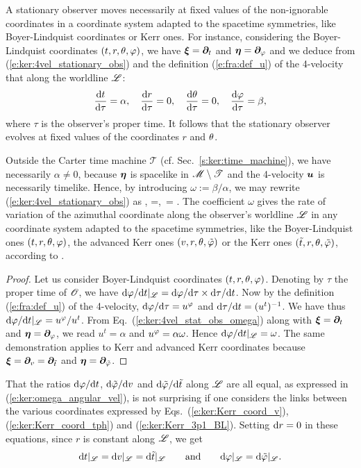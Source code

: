A stationary observer moves necessarily at fixed values of the non-ignorable coordinates
in a coordinate system adapted to the spacetime symmetries, like Boyer-Lindquist coordinates or Kerr
ones. For instance, considering the Boyer-Lindquist coordinates $(t, r, \theta, \varphi)$,
we have $\bm{\xi} = \bm{\partial}_t$ and $\bm{\eta} = \bm{\partial}_\varphi$ and
we deduce from (\ref{e:ker:4vel_stationary_obs}) and the definition (\ref{e:fra:def_u}) of the
4-velocity that along the worldline $\mathscr{L}$:
\[
    \frac{\mathrm{d} t}{\mathrm{d}\tau} = \alpha,\quad
    \frac{\mathrm{d} r}{\mathrm{d}\tau} = 0,\quad
    \frac{\mathrm{d} \theta}{\mathrm{d}\tau} = 0,\quad
    \frac{\mathrm{d} \varphi}{\mathrm{d}\tau} = \beta,
\]
where $\tau$ is the observer's proper time. It follows that
the stationary observer evolves at fixed values of the coordinates $r$ and $\theta$.

Outside the Carter time machine $\mathscr{T}$ (cf. Sec.~\ref{s:ker:time_machine}), we have
necessarily $\alpha\neq 0$, because $\bm{\eta}$ is spacelike in $\mathscr{M}\setminus\mathscr{T}$
and the 4-velocity $\bm{u}$ is necessarily timelike. Hence,
by introducing $\omega := \beta/\alpha$, we may rewrite
(\ref{e:ker:4vel_stationary_obs}) as
\be \label{e:ker:4vel_stat_obs_omega}
    , \qquad \alpha=,\ \omega= .
\ee
The coefficient $\omega$ gives the rate of variation of the azimuthal coordinate along the observer's worldline $\mathscr{L}$
in any coordinate system adapted to the spacetime symmetries, like the Boyer-Lindquist ones
$(t,r,\theta,\varphi)$, the advanced Kerr ones $(v,r,\theta,{\tilde\varphi})$ or the Kerr ones $({\tilde t}, r, \theta, {\tilde\varphi})$,
according to
\be \label{e:ker:omega_angular_vel}
     .
\ee
\begin{proof}
Let us consider Boyer-Lindquist coordinates $(t,r,\theta,\varphi)$. Denoting by $\tau$
the proper time of $\mathscr{O}$, we have
$\mathrm{d}\varphi/\mathrm{d} t |_{\mathscr{L}}= {\mathrm{d} \varphi}/{\mathrm{d} \tau} \times {\mathrm{d}\tau}/{\mathrm{d} t}$. Now by the
definition (\ref{e:fra:def_u}) of the 4-velocity, ${\mathrm{d} \varphi}/{\mathrm{d} \tau} = u^\varphi$
and ${\mathrm{d} \tau}/{\mathrm{d} t} = (u^t)^{-1}$. We have thus $\mathrm{d}\varphi/\mathrm{d} t |_{\mathscr{L}}= u^\varphi/u^t$.
From Eq.~(\ref{e:ker:4vel_stat_obs_omega}) along with
$\bm{\xi} = \bm{\partial}_t$ and $\bm{\eta} = \bm{\partial}_\varphi$, we read $u^t = \alpha$
and $u^\varphi = \alpha\omega$. Hence $\mathrm{d}\varphi/\mathrm{d} t |_{\mathscr{L}}=\omega$.
The same demonstration applies to Kerr and advanced Kerr coordinates because
$\bm{\xi} = \bm{\partial}_v = \bm{\partial}_{{\tilde t}}$ and $\bm{\eta} = \bm{\partial}_{{\tilde\varphi}}$.
\end{proof}
\begin{remark}
That the ratios $\mathrm{d}\varphi/\mathrm{d} t$, $\mathrm{d}{\tilde\varphi}/\mathrm{d} v$ and $\mathrm{d}{\tilde\varphi}/\mathrm{d} {\tilde t}$ along $\mathscr{L}$
are all equal, as expressed in (\ref{e:ker:omega_angular_vel}), is not
surprising if one considers the links between the various coordinates
expressed by Eqs.~(\ref{e:ker:Kerr_coord_v}), (\ref{e:ker:Kerr_coord_tph}) and (\ref{e:ker:Kerr_3p1_BL}).
Setting $\mathrm{d} r = 0$ in these equations, since $r$ is constant along $\mathscr{L}$, we get
\[
    \mathrm{d} t |_{\mathscr{L}} = \mathrm{d} v |_{\mathscr{L}} = \mathrm{d}{\tilde t} |_{\mathscr{L}} \qquad\mbox{and}\qquad
    \mathrm{d} \varphi |_{\mathscr{L}} = \mathrm{d} {\tilde\varphi} | _{\mathscr{L}} .
\]
\end{remark}


